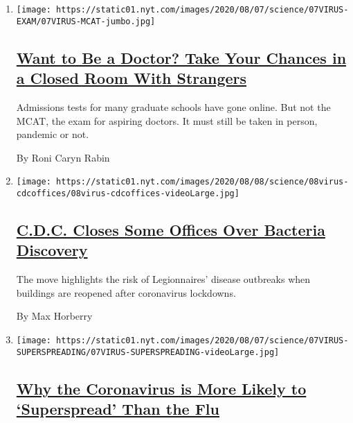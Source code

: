 \begin{enumerate}
\def\labelenumi{\arabic{enumi}.}
\item
  \texttt{[image: https://static01.nyt.com/images/2020/08/07/science/07VIRUS-EXAM/07VIRUS-MCAT-jumbo.jpg]}

  \hypertarget{want-to-be-a-doctor-take-your-chances-in-a-closed-room-with-strangers}{%
  \subsection{\texorpdfstring{\href{/2020/08/07/health/coronavirus-exams-mcat.html}{Want
  to Be a Doctor? Take Your Chances in a Closed Room With
  Strangers}}{Want to Be a Doctor? Take Your Chances in a Closed Room With Strangers}}\label{want-to-be-a-doctor-take-your-chances-in-a-closed-room-with-strangers}}

  Admissions tests for many graduate schools have gone online. But not
  the MCAT, the exam for aspiring doctors. It must still be taken in
  person, pandemic or not.

  By Roni Caryn Rabin
\item
  \texttt{[image: https://static01.nyt.com/images/2020/08/08/science/08virus-cdcoffices/08virus-cdcoffices-videoLarge.jpg]}

  \hypertarget{cdc-closes-some-offices-over-bacteria-discovery}{%
  \subsection{\texorpdfstring{\href{/2020/08/08/health/cdc-legionnaires-coronavirus.html}{C.D.C.
  Closes Some Offices Over Bacteria
  Discovery}}{C.D.C. Closes Some Offices Over Bacteria Discovery}}\label{cdc-closes-some-offices-over-bacteria-discovery}}

  The move highlights the risk of Legionnaires' disease outbreaks when
  buildings are reopened after coronavirus lockdowns.

  By Max Horberry
\item
  \texttt{[image: https://static01.nyt.com/images/2020/08/07/science/07VIRUS-SUPERSPREADING/07VIRUS-SUPERSPREADING-videoLarge.jpg]}

  \hypertarget{why-the-coronavirus-is-more-likely-to-superspread-than-the-flu}{%
  \subsection{\texorpdfstring{\href{/2020/08/07/health/coronavirus-superspreading-contagion.html}{Why
  the Coronavirus is More Likely to `Superspread' Than the
  Flu}}{Why the Coronavirus is More Likely to `Superspread' Than the Flu}}\label{why-the-coronavirus-is-more-likely-to-superspread-than-the-flu}}


\end{enumerate}
